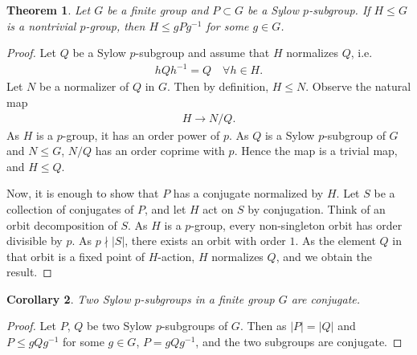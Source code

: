 \documentclass[12pt]{report}
\theoremstyle{plain}
\newtheorem{theorem}{Theorem}[section]
\newtheorem{corollary}[theorem]{Corollary}
\theoremstyle{remark}
\theoremstyle{definition}
\begin{document}
\begin{theorem}
    Let $G$ be a finite group and $P\subset G$ be a Sylow $p$-subgroup. If $H\le G$ is a nontrivial $p$-group, then $H\le gPg^{-1}$ for some $g\in G$.
\end{theorem}
\begin{proof}
    Let $Q$ be a Sylow $p$-subgroup and assume that $H$ normalizes $Q$, i.e.
    \begin{align*}
        hQh^{-1}=Q\quad \forall h\in H.
    \end{align*}
    Let $N$ be a normalizer of $Q$ in $G$. Then by definition, $H\le N$. Observe the natural map
    \begin{align*}
        H\rightarrow N/Q.
    \end{align*}
    As $H$ is a $p$-group, it has an order power of $p$. As $Q$ is a Sylow $p$-subgroup of $G$ and $N\le G$, $N/Q$ has an order coprime with $p$. Hence the map is a trivial map, and $H\le Q$. 

    Now, it is enough to show that $P$ has a conjugate normalized by $H$. Let $S$ be a collection of conjugates of $P$, and let $H$ act on $S$ by conjugation. Think of an orbit decomposition of $S$. As $H$ is a $p$-group, every non-singleton orbit has order divisible by $p$. As $p\nmid |S|$, there exists an orbit with order $1$. As the element $Q$ in that orbit is a fixed point of $H$-action, $H$ normalizes $Q$, and we obtain the result.
\end{proof}

\begin{corollary}
    Two Sylow $p$-subgroups in a finite group $G$ are conjugate.
\end{corollary}
\begin{proof}
    Let $P$, $Q$ be two Sylow $p$-subgroups of $G$. Then as $|P|=|Q|$ and $P\le gQg^{-1}$ for some $g\in G$, $P=gQg^{-1}$, and the two subgroups are conjugate.
\end{proof}
\end{document}
